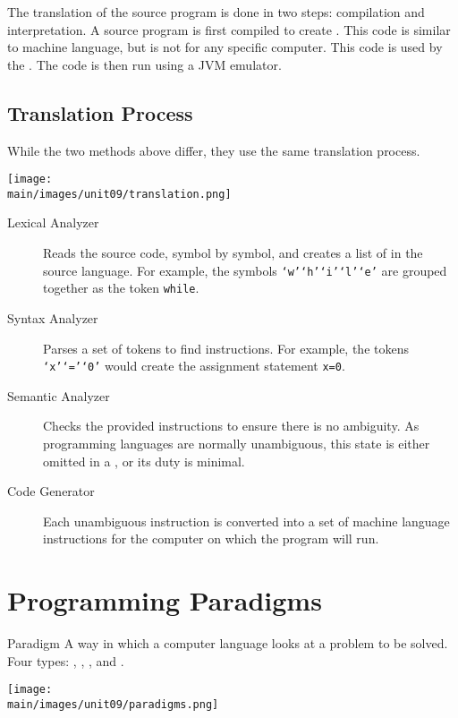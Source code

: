 \documentclass[\main/notes.tex]{subfiles}
\begin{document}
					The translation of the source program is done in two steps: compilation and interpretation. A source program is first compiled to create . This code is similar to machine language, but is not for any specific computer. This code is used by the . The code is then run using a JVM emulator.
			\pagebreak

			\subsection{Translation Process}
				While the two methods above differ, they use the same translation process.
				\begin{center}
					\texttt{[image: \\main/images/unit09/translation.png]}
				\end{center}
				\begin{indentparagraph}
					\begin{description}
						\item[Lexical Analyzer] Reads the source code, symbol by symbol, and creates a list of  in the source language. For example, the symbols \texttt{`w'`h'`i'`l'`e'} are grouped together as the token \texttt{while}.
						\item[Syntax Analyzer] Parses a set of tokens to find instructions. For example, the tokens \texttt{`x'`='`0'} would create the assignment statement \texttt{x=0}.
						\item[Semantic Analyzer] Checks the provided instructions to ensure there is no ambiguity. As programming languages are normally unambiguous, this state is either omitted in a , or its duty is minimal.
						\item[Code Generator] Each unambiguous instruction is converted into a set of machine language instructions for the computer on which the program will run. 
					\end{description}
				\end{indentparagraph}

		\section{Programming Paradigms}
			\begin{definition}{Paradigm}
				A way in which a computer language looks at a problem to be solved. Four types: , , , and .
			\end{definition}
			\begin{center}
				\texttt{[image: \\main/images/unit09/paradigms.png]}
			\end{center}
\end{document}
